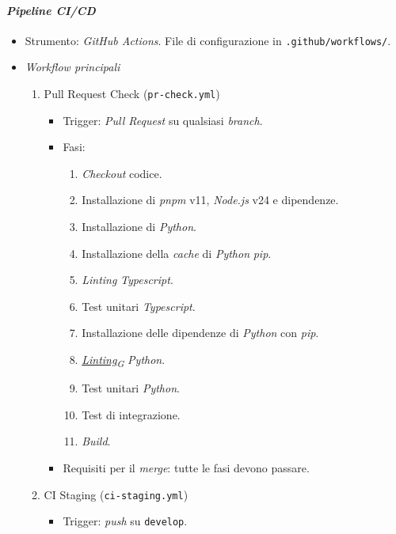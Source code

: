 \documentclass[12pt, a4paper]{article}
\newcommand{\urlglossario}{https://skynetunigroup.github.io/Code_Guardian/Documentazione/PB/glossario_v2.0.0.pdf} %
\newcommand{\glo}[2]{\href{\urlglossario\#nameddest=#2}{#1\textsubscript{G}}}
\begin{document}
\paragraph{\textit{Pipeline CI/CD}}
\begin{itemize}
    \item Strumento: \textit{GitHub Actions}. File di configurazione in \texttt{.github/workflows/}.
    \item \textit{Workflow principali}
    \begin{enumerate}
        \item Pull Request Check (\texttt{pr-check.yml})
        \begin{itemize}
            \item Trigger: \textit{Pull Request} su qualsiasi \textit{branch}.
            \item Fasi:
            \begin{enumerate}[label=\arabic*.]
                \item \textit{Checkout} codice.
                \item Installazione di \textit{pnpm} v11, \textit{Node.js} v24 e dipendenze.
                \item Installazione di \textit{Python}.
                \item Installazione della \textit{cache} di \textit{Python} \textit{pip}.
                \item \textit{Linting} \textit{Typescript}.
                \item Test unitari \textit{Typescript}.
                \item Installazione delle dipendenze di \textit{Python} con \textit{pip}.
                \item \textit{\glo{Linting}{linter}} \textit{Python}.
                \item Test unitari \textit{Python}.
                \item Test di integrazione.
                \item \textit{Build}.
            \end{enumerate}
            \item Requisiti per il \textit{merge}: tutte le fasi devono passare.
        \end{itemize}
        \item CI Staging (\texttt{ci-staging.yml})
        \begin{itemize}
            \item Trigger: \textit{push} su \texttt{develop}.

\end{itemize}
\end{enumerate}
\end{itemize}
\end{document}
